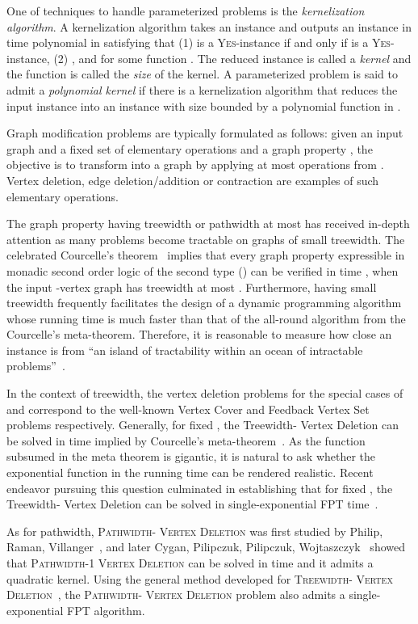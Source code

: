 \documentclass[11pt]{article}
\theoremstyle{remark}
\begin{document}
One of techniques to handle parameterized problems is the \emph{kernelization algorithm}.
A kernelization algorithm takes an instance  and outputs an instance  in time polynomial in  satisfying that
(1)  is a \textsc{Yes}-instance if and only if  is a \textsc{Yes}-instance,
(2) , and  for some function .
The reduced instance is called a \emph{kernel} and the function  is called the \emph{size} of the kernel.
A parameterized problem is said to admit a \emph{polynomial kernel} if there is a kernelization algorithm that reduces
the input instance into an instance with size bounded by a polynomial function  in .

Graph modification problems are typically formulated as follows: given an input graph  and a fixed set  of elementary operations and a graph property , the objective is to transform  into a graph  by applying at most  operations from . Vertex deletion, edge deletion/addition or contraction are examples of such elementary operations. 

The graph property  having treewidth or pathwidth at most  has received in-depth attention as many problems become tractable on graphs of small treewidth. The celebrated Courcelle's theorem~\cite{Cou90} implies that every graph property expressible in monadic second order logic of the second type () can be verified in time , when the input -vertex graph has treewidth at most . Furthermore, having small treewidth frequently facilitates the design of a dynamic programming algorithm whose running time is much faster than that of the all-round algorithm from the Courcelle's meta-theorem. Therefore, it is reasonable to measure how close an instance is from ``an island of tractability within an ocean of intractable problems''~\cite{GaspersS12}.



In the context of treewidth, the vertex deletion problems for the special cases of  and  correspond to the well-known {\sc Vertex Cover} and {\sc Feedback Vertex Set} problems respectively.
Generally, for fixed , the  {\sc Treewidth- Vertex Deletion} can be solved in time  implied by Courcelle's meta-theorem~\cite{Cou90}. As the function  subsumed in the meta theorem is gigantic, it is natural to ask whether the exponential function in the running time can be rendered realistic. Recent endeavor pursuing this question culminated in establishing that for fixed , the {\sc Treewidth- Vertex Deletion} can be solved in single-exponential FPT time~\cite{FominLMS12,KLPRRSS13}. 

As for pathwidth, \textsc{Pathwidth- Vertex Deletion} was first studied  by Philip, Raman, Villanger~\cite{PhilipRV2010}, and later Cygan, Pilipczuk, Pilipczuk, Wojtaszczyk~\cite{CyganPPW2012} showed that \textsc{Pathwidth-1 Vertex Deletion} can be solved in time  and it admits a quadratic kernel. Using the general method developed for \textsc{Treewidth- Vertex Deletion}~\cite{FominLMS12,KLPRRSS13}, the \textsc{Pathwidth- Vertex Deletion} problem also admits a single-exponential FPT algorithm.
\end{document}
